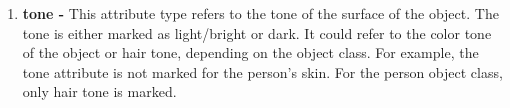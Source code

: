 \documentclass[10pt,twocolumn,letterpaper]{article}
\begin{document}
\begin{enumerate}
\item \textbf{tone -} This attribute type refers to the tone of the surface of the object. The tone is either marked as light/bright or dark. It could refer to the color tone of the object or hair tone, depending on the object class. For example, the tone attribute is not marked for the person's skin. For the person object class, only hair tone is marked. 
    








\end{enumerate}


%
     




    


%
  
\clearpage  
\end{document}
